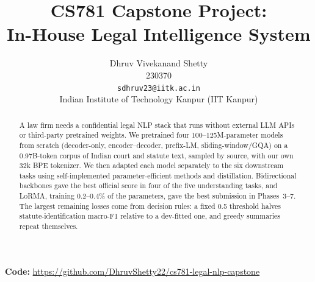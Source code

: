 \documentclass[11pt, oneside]{article}
\title{CS781 Capstone Project:\\
In-House Legal Intelligence System}
\author{
    Dhruv Vivekanand Shetty \\
    230370 \\
    {\tt sdhruv23@iitk.ac.in}\\
    Indian Institute of Technology Kanpur (IIT Kanpur)
}
\date{}
\begin{document}
\maketitle
\vspace{-1.5em}
\begin{abstract}
A law firm needs a confidential legal NLP stack that runs without external LLM APIs or third-party pretrained weights. We pretrained four 100--125M-parameter models from scratch (decoder-only, encoder--decoder, prefix-LM, sliding-window/GQA) on a 0.97B-token corpus of Indian court and statute text, sampled by source, with our own 32k BPE tokenizer. We then adapted each model separately to the six downstream tasks using self-implemented parameter-efficient methods and distillation. Bidirectional backbones gave the best official score in four of the five understanding tasks, and LoRMA, training 0.2--0.4\% of the parameters, gave the best submission in Phases~3--7. The largest remaining losses come from decision rules: a fixed 0.5 threshold halves statute-identification macro-F1 relative to a dev-fitted one, and greedy summaries repeat themselves.
\end{abstract}

\vspace{-0.5em}
\noindent\textbf{Code:} \url{https://github.com/DhruvShetty22/cs781-legal-nlp-capstone}

\end{document}
